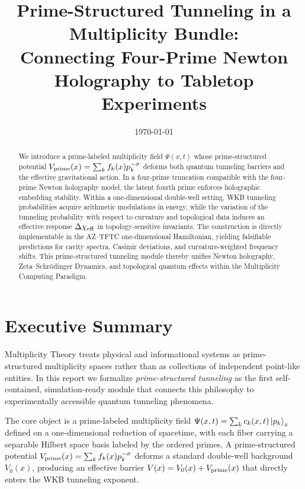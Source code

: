 \documentclass[11pt]{article}
\title{
Prime-Structured Tunneling in a Multiplicity Bundle:\\
Connecting Four-Prime Newton Holography to Tabletop Experiments
}
\author{
}
\date{\today}
\begin{document}
\maketitle

\begin{abstract}
We introduce a prime-labeled multiplicity field \(\Psi(x,t)\) whose
prime-structured potential
\(V_{\rm prime}(x) = \sum_k f_k(x) p_k^{-\sigma}\) deforms both quantum
tunneling barriers and the effective gravitational action. In a
four-prime truncation compatible with the four-prime Newton holography
model, the latent fourth prime enforces holographic embedding stability.
Within a one-dimensional double-well setting, WKB tunneling
probabilities acquire arithmetic modulations in energy, while the
variation of the tunneling probability with respect to curvature and
topological data induces an effective response \(\Delta\chi_{\rm eff}\)
in topology-sensitive invariants. The construction is directly
implementable in the AZ--TFTC one-dimensional Hamiltonian, yielding
falsifiable predictions for cavity spectra, Casimir deviations, and
curvature-weighted frequency shifts. This prime-structured tunneling
module thereby unifies Newton holography, Zeta--Schr\"odinger Dynamics,
and topological quantum effects within the Multiplicity Computing
Paradigm.
\end{abstract}

\tableofcontents

\section*{Executive Summary}

Multiplicity Theory treats physical and informational systems as
prime-structured multiplicity spaces rather than as collections of
independent point-like entities.\cite{hund_tunneling,multiplicity_overview}
In this report we formalize \emph{prime-structured tunneling} as the
first self-contained, simulation-ready module that connects this
philosophy to experimentally accessible quantum tunneling phenomena.

The core object is a prime-labeled multiplicity field
\(\Psi(x,t) = \sum_k c_k(x,t)\ket{p_k}_x\) defined on a one-dimensional
reduction of spacetime, with each fiber carrying a separable Hilbert
space basis labeled by the ordered primes.\cite{tunneling_topology_draft}
A prime-structured potential
\(V_{\rm prime}(x) = \sum_k f_k(x)p_k^{-\sigma}\) deforms a standard
double-well background \(V_0(x)\), producing an effective barrier
\(V(x)=V_0(x)+V_{\rm prime}(x)\) that directly enters the WKB tunneling
exponent.
\end{document}
